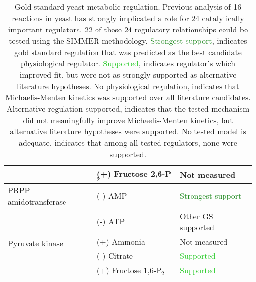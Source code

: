 \begin{singlespace}
\begin{table}[H]
\begin{tabular}{|l|l|l|}
  & (+) Fructose 2,6-P$_{2}$ & Not measured\\\hline 
 PRPP amidotransferase & (-) AMP & \textcolor{ForestGreen}{Strongest support}\\\hline 
 \multirow{4}{*}{Pyruvate kinase} & (-) ATP & Other GS supported\\ 
 & (+) Ammonia & Not measured\\ 
 & (-) Citrate & \textcolor{LimeGreen}{Supported}\\ 
 & (+) Fructose 1,6-P$_{2}$ & \textcolor{LimeGreen}{Supported}\\ 
   \hline
\end{tabular}
\caption[Gold-standard yeast metabolic regulation]{Gold-standard yeast metabolic regulation.  Previous analysis of 16 reactions in yeast has strongly implicated a role for 24 catalytically important regulators.  22 of these 24 regulatory relationships could be tested using the SIMMER methodology. \textcolor{ForestGreen}{Strongest support}, indicates gold standard regulation that was predicted as the best candidate physiological regulator. \textcolor{LimeGreen}{Supported}, indicates regulator's which improved fit, but were not as strongly supported as alternative literature hypotheses. \textcolor{Cerulean}{No physiological regulation}, indicates that Michaelis-Menten kinetics was supported over all literature candidates. \textcolor{BurntOrange}{Alternative regulation supported}, indicates that the tested mechanism did not meaningfully improve Michaelis-Menten kinetics, but alternative literature hypotheses were supported. \textcolor{BurntOrange}{No tested model is adequate}, indicates that among all tested regulators, none were supported.}
\label{tab:GS}
\end{table}
\end{singlespace}
\normalsize


